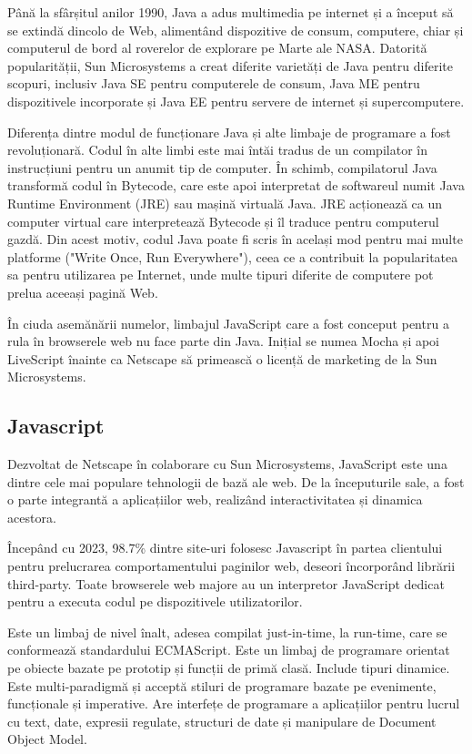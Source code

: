 \documentclass[a4paper,12pt]{article}
\begin{document}
    Până la sfârșitul anilor 1990, Java a adus multimedia pe internet și a început să se extindă
    dincolo de Web, alimentând dispozitive de consum, computere, chiar și computerul de bord al
    roverelor de explorare pe Marte ale NASA. Datorită popularității, Sun Microsystems a creat diferite
    varietăți de Java pentru diferite scopuri, inclusiv Java SE pentru computerele de consum, Java ME pentru 
    dispozitivele incorporate și Java EE pentru servere de internet și supercomputere.

    Diferența dintre modul de funcționare Java și alte limbaje de programare a fost 
    revoluționară. Codul în alte limbi este mai întăi tradus de un compilator în instrucțiuni pentru un anumit tip de computer. În schimb,
    compilatorul Java transformă codul în Bytecode, care este apoi interpretat de softwareul numit Java Runtime Environment
    (JRE) sau mașină virtuală Java. JRE acționează ca un computer virtual care interpretează Bytecode și îl traduce pentru
    computerul gazdă. Din acest motiv, codul Java poate fi scris în același mod pentru mai multe platforme 
    ("Write Once, Run Everywhere"), ceea ce a contribuit la popularitatea sa pentru utilizarea pe Internet,
    unde multe tipuri diferite de computere pot prelua aceeași pagină Web.
    
    În ciuda asemănării numelor, limbajul JavaScript care a fost conceput pentru a rula în browserele web nu face parte din Java.
    Inițial se numea Mocha și apoi LiveScript înainte ca Netscape să primească o licență de marketing de la Sun Microsystems.
    \subsection{Javascript}
    Dezvoltat de Netscape în colaborare cu Sun Microsystems, JavaScript este una dintre cele mai populare tehnologii de bază ale web. De la
    începuturile sale, a fost o parte integrantă a aplicațiilor web, realizând interactivitatea și dinamica acestora.

    Începând cu 2023, 98.7\% dintre site-uri folosesc Javascript în partea clientului pentru prelucrarea comportamentului
    paginilor web, deseori încorporând librării third-party. Toate browserele web majore au un interpretor JavaScript dedicat pentru a executa
    codul pe dispozitivele utilizatorilor.
    
    Este un limbaj de nivel înalt, adesea compilat just-in-time, la run-time, care se conformează standardului ECMAScript. Este un limbaj de programare orientat pe obiecte
    bazate pe prototip și funcții de primă clasă. Include tipuri dinamice. Este multi-paradigmă și acceptă stiluri de programare bazate pe
    evenimente, funcționale și imperative. Are interfețe de programare a aplicațiilor pentru lucrul cu text, date, expresii regulate, 
    structuri de date și manipulare de Document Object Model.
\end{document}
